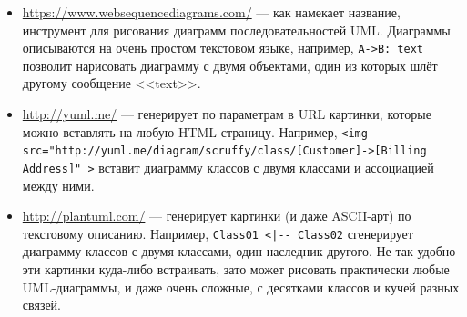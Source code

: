 \documentclass{../../text-style}
\begin{document}
\begin{itemize}
    \begin{itemize}
        \item \url{https://www.websequencediagrams.com/} --- как намекает название, инструмент для рисования диаграмм последовательностей UML. Диаграммы описываются на очень простом текстовом языке, например, \verb|A->B: text| позволит нарисовать диаграмму с двумя объектами, один из которых шлёт другому сообщение <<text>>.
        \item \url{http://yuml.me/} --- генерирует по параметрам в URL картинки, которые можно вставлять на любую HTML-страницу. Например, \verb|<img src="http://yuml.me/diagram/scruffy/class/[Customer]->[Billing Address]" >| вставит диаграмму классов с двумя классами и ассоциацией между ними.
        \item \url{http://plantuml.com/} --- генерирует картинки (и даже ASCII-арт) по текстовому описанию. Например, \verb&Class01 <|-- Class02& сгенерирует диаграмму классов с двумя классами, один наследник другого. Не так удобно эти картинки куда-либо встраивать, зато может рисовать практически любые UML-диаграммы, и даже очень сложные, с десятками классов и кучей разных связей.
    \end{itemize}
\end{itemize}
\end{document}
